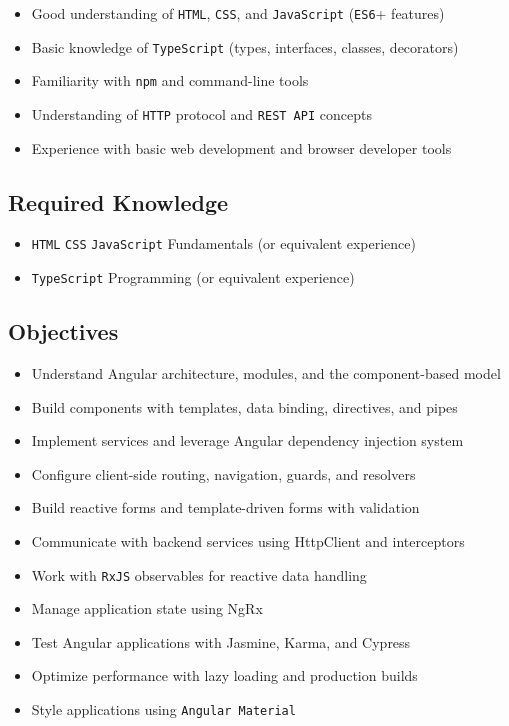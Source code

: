 \documentclass[
]{article}
\providecommand{\tightlist}{%
  \setlength{\itemsep}{0pt}\setlength{\parskip}{0pt}}
\begin{document}
\begin{itemize}
\tightlist
\item
  Good understanding of \texttt{HTML}, \texttt{CSS}, and
  \texttt{JavaScript} (\texttt{ES6}+ features)
\item
  Basic knowledge of \texttt{TypeScript} (types, interfaces, classes,
  decorators)
\item
  Familiarity with \texttt{npm} and command-line tools
\item
  Understanding of \texttt{HTTP} protocol and \texttt{REST\ API}
  concepts
\item
  Experience with basic web development and browser developer tools
\end{itemize}

\subsection{Required Knowledge}\label{required-knowledge}

\begin{itemize}
\tightlist
\item
  \texttt{HTML} \texttt{CSS} \texttt{JavaScript} Fundamentals (or
  equivalent experience)
\item
  \texttt{TypeScript} Programming (or equivalent experience)
\end{itemize}

\subsection{Objectives}\label{objectives}

\begin{itemize}
\tightlist
\item
  Understand Angular architecture, modules, and the component-based
  model
\item
  Build components with templates, data binding, directives, and pipes
\item
  Implement services and leverage Angular dependency injection system
\item
  Configure client-side routing, navigation, guards, and resolvers
\item
  Build reactive forms and template-driven forms with validation
\item
  Communicate with backend services using HttpClient and interceptors
\item
  Work with \texttt{RxJS} observables for reactive data handling
\item
  Manage application state using NgRx
\item
  Test Angular applications with Jasmine, Karma, and Cypress
\item
  Optimize performance with lazy loading and production builds
\item
  Style applications using \texttt{Angular\ Material}
\end{itemize}
\end{document}
